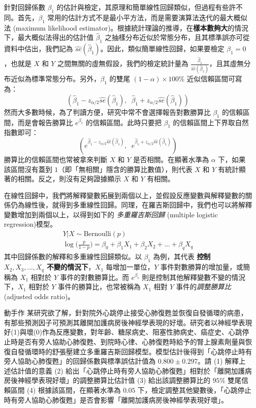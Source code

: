     針對回歸係數 $\beta_1$ 的估計與檢定，其原理和簡單線性回歸類似，但過程有些許不同。首先，$\beta_1$ 常用的估計方式不是最小平方法，而是需要演算法迭代的最大概似法 (maximum likelihood estimator)。根據統計理論的推導，在\textbf{樣本數夠大}的情況下，最大概似法得出的估計值 $\hat{\beta}_1$ 之抽樣分布近似於常態分布，且其標準誤亦可從資料中估出，我們記為 $\widehat{se}(\hat{\beta}_1)$。因此，類似簡單線性回歸，如果要檢定 $\beta_1 = 0$，也就是 $X$ 和 $Y$ 之間無關的虛無假設，我們的檢定統計量為 $\frac{\hat{\beta}_1}{\widehat{se}(\hat{\beta}_1)}$，且其虛無分布近似為標準常態分布。另外，$\beta_1$ 的雙尾 $(1-\alpha)\times 100\%$ 近似信賴區間可寫為：
    \smallskip
    \[(\hat{\beta}_1 - z_{\alpha/2} \widehat{se}(\hat{\beta}_1), \;\; \hat{\beta}_1 + z_{\alpha/2} \widehat{se}(\hat{\beta}_1))\]
    \smallskip
    然而大多數時候，為了判讀方便，研究中常不會選擇報告對數勝算比 $\beta_1$ 的信賴區間，而是會報告勝算比 $e^{\beta_1}$ 的信賴區間。此時只要把 $\beta_1$ 的信賴區間上下界取自然指數即可：
    \smallskip
    \[(e^{\hat{\beta}_1 - z_{\alpha/2} \widehat{se}(\hat{\beta}_1)}, \;\; e^{\hat{\beta}_1 + z_{\alpha/2} \widehat{se}(\hat{\beta}_1)})\]
    \smallskip
    勝算比的信賴區間也常被拿來判斷 $X$ 和 $Y$ 是否相關。在顯著水準為 $\alpha$ 下，如果該區間沒有蓋到 $1$（即「無相關」隱含的勝算比數值），則代表 $X$ 和 $Y$ 有統計顯著的相關。反之，則沒有足夠證據顯示 $X$ 和 $Y$ 有相關。

    \medskip

    在線性回歸中，我們將解釋變數拓展到兩個以上，並假設反應變數與解釋變數的關係仍為線性後，就得到多重線性回歸。同理，在羅吉斯回歸中，我們也可以將解釋變數增加到兩個以上，以得到如下的 \textit{多重羅吉斯回歸} (multiple logistic regression)模型。
    \begin{gather*}
        Y|X \sim \text{Bernoulli}(p)\\
        \log\Big(\frac{p}{1-p}\Big) = \beta_0 + \beta_1 X_1 + \beta_2 X_2 + ... + \beta_q X_q
    \end{gather*}
    其中回歸係數的解釋和多重線性回歸類似。以 $\beta_1$ 為例，其代表 \textbf{控制 $X_2, X_3,...,X_q$ 不變的情況下}，$X_1$ 每增加一單位，$Y$ 事件對數勝算的增加量，或簡稱為 $X_1$ 相對於 $Y$ 事件的對數勝算比。而 $e^{\beta_1}$ 則是控制其他解釋變數不變的情況下，$X_1$ 相對於 $Y$ 事件的勝算比，也常被稱為 $X_1$ 相對 $Y$ 事件的\textit{調整勝算比} (adjusted odds ratio)。

    \bigskip

    \begin{custom}{動手作}
        某研究欲了解，針對院外心跳停止接受心肺復甦並恢復自發循環的病患，有那些預測因子可預測其離開加護病房後神經學表現的好壞。研究者以神經學表現好(1)與壞(0)作為反應變數，對年齡、糖尿病史、阻塞性肺病史、癌症史、心跳停止時是否有旁人協助心肺復甦、到院時心律、心肺復甦時給予的腎上腺素劑量與恢復自發循環時的舒張壓建立多重羅吉斯回歸模型。模型估計後得到「心跳停止時有旁人協助心肺復甦」的回歸係數與標準誤估計值為 $0.800 \pm 0.297$。請 (1) 解釋上述估計值的意義 (2) 給出「心跳停止時有旁人協助心肺復甦」相對於「離開加護病房後神經學表現好壞」的調整勝算比估計值 (3) 給出該調整勝算比的 $95\%$ 雙尾信賴區間 (4) 根據該區間，在顯著水準為 $0.05$ 下，檢定調整其他變數後，「心跳停止時有旁人協助心肺復甦」是否會影響「離開加護病房後神經學表現好壞」。
    \end{custom}

